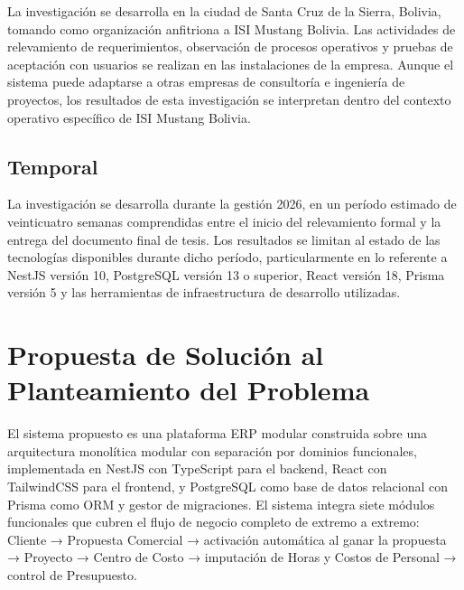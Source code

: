 \documentclass{univalle-perfil}
\begin{document}
La investigación se desarrolla en la ciudad de Santa Cruz de la Sierra, Bolivia, tomando como organización anfitriona a ISI Mustang Bolivia. Las actividades de relevamiento de requerimientos, observación de procesos operativos y pruebas de aceptación con usuarios se realizan en las instalaciones de la empresa. Aunque el sistema puede adaptarse a otras empresas de consultoría e ingeniería de proyectos, los resultados de esta investigación se interpretan dentro del contexto operativo específico de ISI Mustang Bolivia.

\subsection{Temporal}

La investigación se desarrolla durante la gestión 2026, en un período estimado de veinticuatro semanas comprendidas entre el inicio del relevamiento formal y la entrega del documento final de tesis. Los resultados se limitan al estado de las tecnologías disponibles durante dicho período, particularmente en lo referente a NestJS versión 10, PostgreSQL versión 13 o superior, React versión 18, Prisma versión 5 y las herramientas de infraestructura de desarrollo utilizadas.

\section{Propuesta de Solución al Planteamiento del Problema}

El sistema propuesto es una plataforma ERP modular construida sobre una arquitectura monolítica modular con separación por dominios funcionales, implementada en NestJS con TypeScript para el backend, React con TailwindCSS para el frontend, y PostgreSQL como base de datos relacional con Prisma como ORM y gestor de migraciones. El sistema integra siete módulos funcionales que cubren el flujo de negocio completo de extremo a extremo: Cliente → Propuesta Comercial → activación automática al ganar la propuesta → Proyecto → Centro de Costo → imputación de Horas y Costos de Personal → control de Presupuesto.
\end{document}
